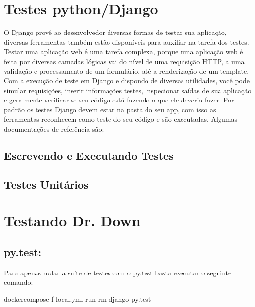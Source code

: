 \documentclass[letterpaper,10pt,english]{sphinxmanual}
\begin{document}
\section{Testes python/Django}
\label{\detokenize{tests:testes-python-django}}
O Django provê ao desenvolvedor diversas formas de testar sua aplicação, diversas ferramentas  também estão disponíveis para auxiliar na tarefa dos testes.
Testar uma aplicação web é uma tarefa complexa, porque uma aplicação web é feita por diversas camadas lógicas \textendash{} vai do nível de uma requisição HTTP, a uma validação e processamento de um formulário, até a renderização de um template. Com a execução de teste em Django e dispondo de diversas utilidades, você pode simular requisições, inserir informações testes, inspecionar saídas de sua aplicação e geralmente verificar se seu código está fazendo o que ele deveria fazer.
Por padrão os testes Django devem estar na pasta  do seu app, com isso as ferramentas reconhecem como teste do seu código e são executadas.
Algumas documentações de referência são:


\subsection{Escrevendo e Executando Testes}
\label{\detokenize{tests:testes-unitarios}}\label{\detokenize{tests:id1}}

\subsection{Testes Unitários}
\label{\detokenize{tests:id2}}

\section{Testando Dr. Down}
\label{\detokenize{tests:testando-dr-down}}

\subsection{py.test:}
\label{\detokenize{tests:py-test}}
Para apenas rodar a suíte de testes com o py.test basta executar o seguinte comando:

\begin{sphinxVerbatim}[commandchars=\\\{\}]
\PYGZdl{} docker\PYGZhy{}compose \PYGZhy{}f local.yml run \PYGZhy{}\PYGZhy{}rm django py.test
\end{sphinxVerbatim}
\end{document}
